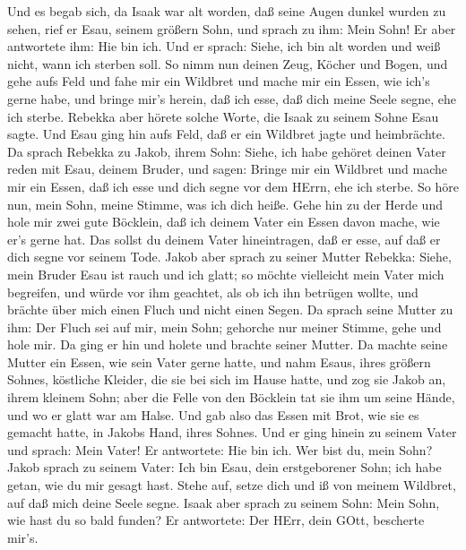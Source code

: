  Und es begab sich, da Isaak war alt worden, daß seine Augen
dunkel wurden zu sehen, rief er Esau, seinem größern Sohn, und sprach zu
ihm: Mein Sohn! Er aber antwortete ihm: Hie bin ich.  Und er
sprach: Siehe, ich bin alt worden und weiß nicht, wann ich sterben soll.
 So nimm nun deinen Zeug, Köcher und Bogen, und gehe aufs
Feld und fahe mir ein Wildbret  und mache mir ein Essen, wie
ich's gerne habe, und bringe mir's herein, daß ich esse, daß dich meine
Seele segne, ehe ich sterbe.  Rebekka aber hörete solche
Worte, die Isaak zu seinem Sohne Esau sagte. Und Esau ging hin aufs
Feld, daß er ein Wildbret jagte und heimbrächte.  Da sprach
Rebekka zu Jakob, ihrem Sohn: Siehe, ich habe gehöret deinen Vater reden
mit Esau, deinem Bruder, und sagen:  Bringe mir ein Wildbret
und mache mir ein Essen, daß ich esse und dich segne vor dem HErrn, ehe
ich sterbe.  So höre nun, mein Sohn, meine Stimme, was ich
dich heiße.  Gehe hin zu der Herde und hole mir zwei gute
Böcklein, daß ich deinem Vater ein Essen davon mache, wie er's gerne
hat.  Das sollst du deinem Vater hineintragen, daß er esse,
auf daß er dich segne vor seinem Tode.  Jakob aber sprach
zu seiner Mutter Rebekka: Siehe, mein Bruder Esau ist rauch und ich
glatt;  so möchte vielleicht mein Vater mich begreifen, und
würde vor ihm geachtet, als ob ich ihn betrügen wollte, und brächte über
mich einen Fluch und nicht einen Segen.  Da sprach seine
Mutter zu ihm: Der Fluch sei auf mir, mein Sohn; gehorche nur meiner
Stimme, gehe und hole mir.  Da ging er hin und holete und
brachte seiner Mutter. Da machte seine Mutter ein Essen, wie sein Vater
gerne hatte,  und nahm Esaus, ihres größern Sohnes,
köstliche Kleider, die sie bei sich im Hause hatte, und zog sie Jakob
an, ihrem kleinem Sohn;  aber die Felle von den Böcklein
tat sie ihm um seine Hände, und wo er glatt war am Halse. 
Und gab also das Essen mit Brot, wie sie es gemacht hatte, in Jakobs
Hand, ihres Sohnes.  Und er ging hinein zu seinem Vater und
sprach: Mein Vater! Er antwortete: Hie bin ich. Wer bist du, mein Sohn?
 Jakob sprach zu seinem Vater: Ich bin Esau, dein
erstgeborener Sohn; ich habe getan, wie du mir gesagt hast. Stehe auf,
setze dich und iß von meinem Wildbret, auf daß mich deine Seele segne.
 Isaak aber sprach zu seinem Sohn: Mein Sohn, wie hast du
so bald funden? Er antwortete: Der HErr, dein GOtt, bescherte mir's.
